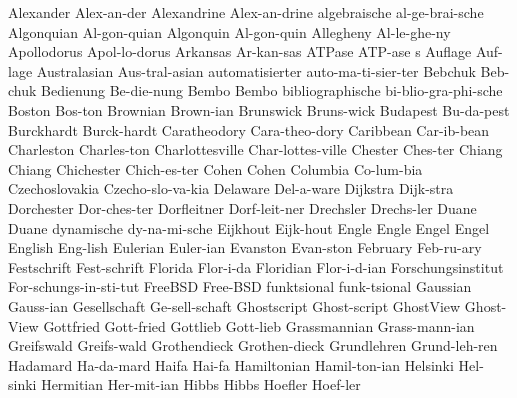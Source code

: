 \begingroup
\eightpoint
\NewWordtrue
\1 Alexander		Alex-an-der		%
\NewWordtrue
\1 Alexandrine		Alex-an-drine		%
\1 algebraische 	al-ge-brai-sche
\1 Algonquian		Al-gon-quian		%
\1 Algonquin		Al-gon-quin		%
\1 Allegheny		Al-le-ghe-ny
\1 Apollodorus		Apol-lo-dorus		%
\1 Arkansas		Ar-kan-sas
\5 ATPase		ATP-ase s		%
\1 Auflage		Auf-lage		%
\1 Australasian 	Aus-tral-asian
\1 automatisierter	auto-ma-ti-sier-ter
\1 Bebchuk		Beb-chuk		%
\1 Bedienung		Be-die-nung
\1 Bembo                Bembo			%
\1 bibliographische	bi-blio-gra-phi-sche
\1 Boston		Bos-ton
\1 Brownian		Brown-ian
\1 Brunswick		Bruns-wick
\1 Budapest		Bu-da-pest
\1 Burckhardt		Burck-hardt		%
\NewWordtrue
\1 Caratheodory 	Cara-theo-dory		%
\1 Caribbean		Car-ib-bean
\1 Charleston		Charles-ton
\1 Charlottesville	Char-lottes-ville
\1 Chester		Ches-ter		%
\1 Chiang		Chiang			%
\1 Chichester		Chich-es-ter		%
\1 Cohen		Cohen			%
\1 Columbia		Co-lum-bia
\1 Czechoslovakia	Czecho-slo-va-kia
\1 Delaware		Del-a-ware		%
\1 Dijkstra		Dijk-stra
\1 Dorchester		Dor-ches-ter		%
\1 Dorfleitner		Dorf-leit-ner		%
\1 Drechsler		Drechs-ler		%
\1 Duane		Duane			%
\1 dynamische		dy-na-mi-sche
\1 Eijkhout		Eijk-hout		%
\1 Engle		Engle			%
\1 Engel		Engel			%
\1 English		Eng-lish
\1 Eulerian		Euler-ian
\1 Evanston		Evan-ston
\1 February		Feb-ru-ary
\1 Festschrift		Fest-schrift
\1 Florida		Flor-i-da
\1 Floridian		Flor-i-d-ian
\1 Forschungsinstitut	For-schungs-in-sti-tut
\1 FreeBSD		Free-BSD		%
\1 funktsional		funk-tsional
\1 Gaussian		Gauss-ian
\1 Gesellschaft 	Ge-sell-schaft		%
\1 Ghostscript		Ghost-script		%
\1 GhostView		Ghost-View		%
\1 Gottfried		Gott-fried		%
\1 Gottlieb		Gott-lieb		%
\1 Grassmannian		Grass-mann-ian		%
\1 Greifswald		Greifs-wald
\1 Grothendieck		Grothen-dieck
\1 Grundlehren		Grund-leh-ren
\1 Hadamard		Ha-da-mard		%
\1 Haifa		Hai-fa
\1 Hamiltonian		Hamil-ton-ian
\1 Helsinki		Hel-sinki
\1 Hermitian		Her-mit-ian
\1 Hibbs		Hibbs
\1 Hoefler		Hoef-ler		%
